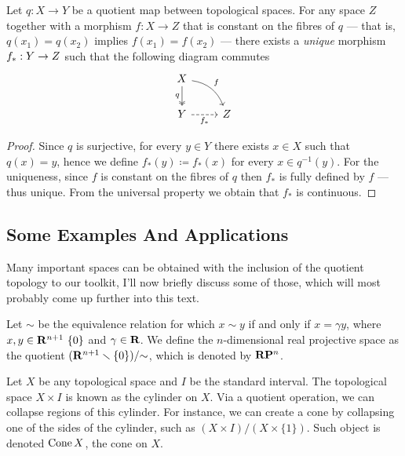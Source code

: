 \begin{theorem}
\label{thm:Top-quotient-descent}
Let \(q: X \to Y\) be a quotient map between topological spaces. For any space
\(Z\) together with a morphism \(f: X \to Z\) that is constant on the fibres of
\(q\) --- that is, \(q(x_1) = q(x_2)\) implies \(f(x_1) = f(x_2)\) --- there
exists a \emph{unique} morphism \(f_{*}: Y \to Z\) such that the following
diagram commutes
\[
\begin{tikzcd}
X \ar[d, two heads, "q", swap] \ar[dr, bend left, "f"] & \\
Y \ar[r, dashed, swap, "f_{*}"] &Z
\end{tikzcd}
\]
\end{theorem}

\begin{proof}
Since \(q\) is surjective, for every \(y \in Y\) there exists \(x \in X\) such
that \(q(x) = y\), hence we define \(f_{*}(y) \coloneq f_{*}(x)\) for every
\(x \in q^{-1}(y)\). For the uniqueness, since \(f\) is constant on the fibres
of \(q\) then \(f_{*}\) is fully defined by \(f\) --- thus unique. From the
universal property we obtain that \(f_{*}\) is continuous.
\end{proof}

\subsection{Some Examples And Applications}

Many important spaces can be obtained with the inclusion of the quotient
topology to our toolkit, I'll now briefly discuss some of those, which will most
probably come up further into this text.

\begin{example}\label{exp:real-projective-space}
Let \(\sim\) be the equivalence relation for which \(x \sim y\) if and only if
\(x = \gamma y\), where \(x, y \in \mathbf{R}^{n+1} \ \{0\}\) and \(\gamma \in \mathbf{R}\). We
define the \(n\)-dimensional real projective space as the quotient \((\mathbf{R}^{n+1}
\smallsetminus \{0\})/{\sim}\), which is denoted by \(\mathbf{R} \mathbf{P}^{n}\).
\end{example}

\begin{definition}[Cone]\label{def:cone}
Let \(X\) be any topological space and \(I\) be the standard interval. The
topological space \(X \times I\) is known as the cylinder on \(X\). Via a
quotient operation, we can collapse regions of this cylinder. For instance,
we can create a cone by collapsing one of the sides of the cylinder, such as
\((X \times I) / (X \times \{1\})\). Such object is denoted \(\operatorname{Cone} X\), the
cone on \(X\).
\end{definition}

